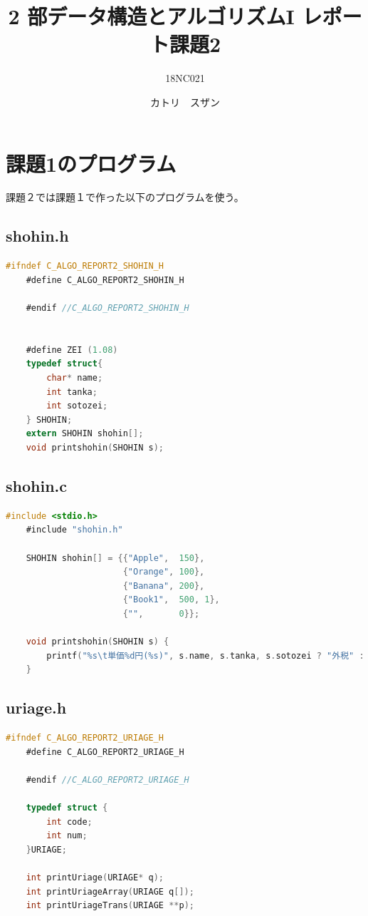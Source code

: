 \documentclass[10pt]{article}
\title{2 部データ構造とアルゴリズムI レポート課題2}
\author{18NC021 }
\date{カトリ　スザン}
\begin{document}
\begin{titlepage}
	\maketitle
\end{titlepage}

\tableofcontents
\pagebreak

\section{課題1のプログラム}
課題２では課題１で作った以下のプログラムを使う。

\subsection{shohin.h}
\begin{lstlisting}[language=C]
    #ifndef C_ALGO_REPORT2_SHOHIN_H
    #define C_ALGO_REPORT2_SHOHIN_H
    
    #endif //C_ALGO_REPORT2_SHOHIN_H
    
    
    #define ZEI (1.08)
    typedef struct{
        char* name;
        int tanka;
        int sotozei;
    } SHOHIN;
    extern SHOHIN shohin[];
    void printshohin(SHOHIN s);
\end{lstlisting}

\subsection{shohin.c}
\begin{lstlisting}[language=C]
    #include <stdio.h>
    #include "shohin.h"
    
    SHOHIN shohin[] = {{"Apple",  150},
                       {"Orange", 100},
                       {"Banana", 200},
                       {"Book1",  500, 1},
                       {"",       0}};
    
    void printshohin(SHOHIN s) {
        printf("%s\t単価%d円(%s)", s.name, s.tanka, s.sotozei ? "外税" : "内税");
    }
\end{lstlisting}

\subsection{uriage.h}
\begin{lstlisting}[language=C]
    #ifndef C_ALGO_REPORT2_URIAGE_H
    #define C_ALGO_REPORT2_URIAGE_H
    
    #endif //C_ALGO_REPORT2_URIAGE_H
    
    typedef struct {
        int code;
        int num;
    }URIAGE;
    
    int printUriage(URIAGE* q);
    int printUriageArray(URIAGE q[]);
    int printUriageTrans(URIAGE **p);
\end{lstlisting}
\end{document}
